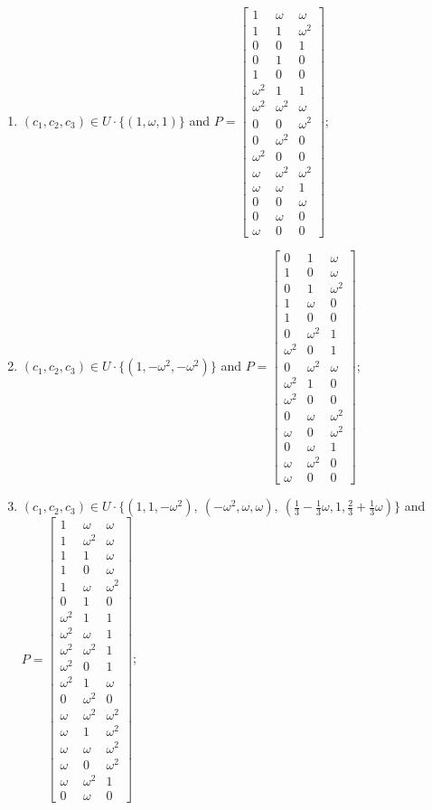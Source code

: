 \begin{enumerate}
\item[(f89)\,\newitem] $(c_1,c_2,c_3)\in U\cdot\{(1,\omega,1)\}$ and $P=\begin{bmatrix}1&\omega&\omega\\1&1&\omega^2\\0&0&1\\0&1&0\\1&0&0\\\omega^2&1&1\\\omega^2&\omega^2&\omega\\0&0&\omega^2\\0&\omega^2&0\\\omega^2&0&0\\\omega&\omega^2&\omega^2\\\omega&\omega&1\\0&0&\omega\\0&\omega&0\\\omega&0&0\end{bmatrix}$;
\item[(f90)\,\newitem] $(c_1,c_2,c_3)\in U\cdot\{(1,-\omega^2,-\omega^2)\}$ and $P=\begin{bmatrix}0&1&\omega\\1&0&\omega\\0&1&\omega^2\\1&\omega&0\\1&0&0\\0&\omega^2&1\\\omega^2&0&1\\0&\omega^2&\omega\\\omega^2&1&0\\\omega^2&0&0\\0&\omega&\omega^2\\\omega&0&\omega^2\\0&\omega&1\\\omega&\omega^2&0\\\omega&0&0\end{bmatrix}$;
\item[(f91)\,\newitem] $(c_1,c_2,c_3)\in U\cdot\{(1,1,-\omega^2),\allowbreak\ (-\omega^2,\omega,\omega),\allowbreak\ (\tfrac{1}{3}-\tfrac{1}{3}\omega,1,\tfrac{2}{3}+\tfrac{1}{3}\omega)\}$ and $P=\begin{bmatrix}1&\omega&\omega\\1&\omega^2&\omega\\1&1&\omega\\1&0&\omega\\1&\omega&\omega^2\\0&1&0\\\omega^2&1&1\\\omega^2&\omega&1\\\omega^2&\omega^2&1\\\omega^2&0&1\\\omega^2&1&\omega\\0&\omega^2&0\\\omega&\omega^2&\omega^2\\\omega&1&\omega^2\\\omega&\omega&\omega^2\\\omega&0&\omega^2\\\omega&\omega^2&1\\0&\omega&0\end{bmatrix}$;

\end{enumerate}
